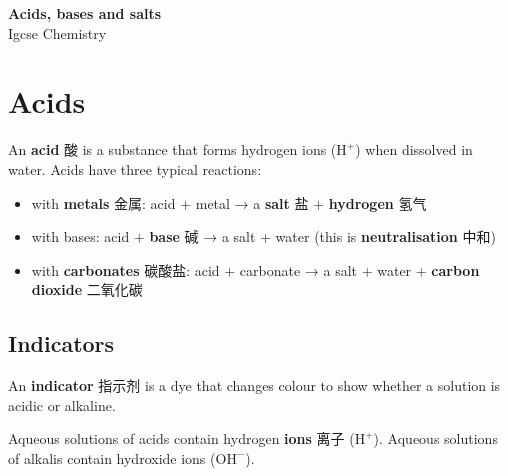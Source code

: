 \documentclass[11pt]{article}
\begin{document}
\begin{center}
  {\LARGE\bfseries Acids, bases and salts}\\[0.35em]
  {\large Igcse Chemistry}
\end{center}
\vspace{0.6em}

\section*{Acids}

An \textbf{acid} 酸 is a substance that forms hydrogen ions ($\text{H}^{+}$) when dissolved in water. Acids have three typical reactions:

\begin{itemize}
\item with \textbf{metals} 金属: acid + metal → a \textbf{salt} 盐 + \textbf{hydrogen} 氢气

\item with bases: acid + \textbf{base} 碱 → a salt + water (this is \textbf{neutralisation} 中和)

\item with \textbf{carbonates} 碳酸盐: acid + carbonate → a salt + water + \textbf{carbon dioxide} 二氧化碳

\end{itemize}

\subsection*{Indicators}

An \textbf{indicator} 指示剂 is a dye that changes colour to show whether a solution is acidic or alkaline.

\begin{center}
\end{center}

Aqueous solutions of acids contain hydrogen \textbf{ions} 离子 ($\text{H}^{+}$). Aqueous solutions of alkalis contain hydroxide ions ($\text{OH}^{-}$).
\end{document}

